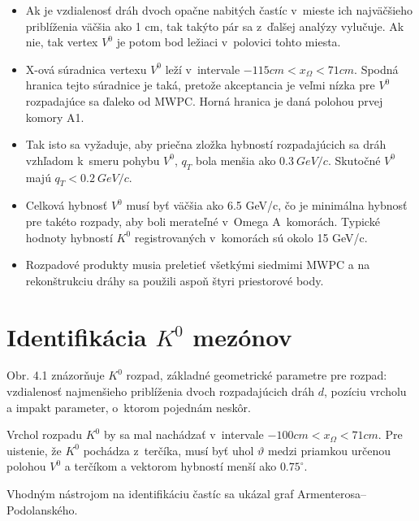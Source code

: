\begin{itemize}
\item{ Ak je vzdialenosť dráh dvoch opačne nabitých častíc  v~mieste ich
  najväčšieho priblíženia väčšia ako 1 cm, tak takýto pár sa
  z~ďalšej analýzy  vylučuje. Ak nie, tak vertex $V^{0}$ je potom bod ležiaci
  v~polovici tohto miesta.}
\item{X-ová súradnica vertexu $V^{0}$ leží v~intervale
  $-115cm<x_{\Omega}<71cm$. Spodná hranica tejto súradnice je taká, pretože
  akceptancia je veľmi nízka pre $V^{0}$ rozpadajúce sa ďaleko od MWPC. Horná
  hranica je daná polohou prvej komory A1.}
\item{Tak isto sa vyžaduje, aby priečna zložka hybností rozpadajúcich
  sa dráh vzhľadom k~smeru pohybu $V^{0}$, $q_{T}$ bola menšia ako $0.3\:
  GeV/c$. Skutočné $V^{0}$ majú $q_{T}<0.2\: GeV/c$.}
\item{Celková hybnosť $V^{0}$ musí byť väčšia ako 6.5 GeV/c, čo je
  minimálna hybnosť pre takéto rozpady, aby boli merateľné v~Omega A~komorách.
  Typické hodnoty hybností $K^{0}$ registrovaných v~komorách sú okolo 15
  GeV/c.}
\item{Rozpadové produkty musia preletieť všetkými siedmimi MWPC a na
  rekonštrukciu dráhy sa použili aspoň štyri priestorové body.}
\end{itemize}
\section{Identifikácia $K^{0}$ mezónov}
Obr. 4.1 znázorňuje $K^{0}$ rozpad, základné
geometrické parametre pre rozpad: vzdialenosť  najmenšieho priblíženia dvoch
rozpadajúcich dráh $d$, pozíciu vrcholu a impakt parameter, o~ktorom
pojednám neskôr.

Vrchol rozpadu $K^{0}$ by sa mal nachádzať v~intervale
$-100cm<x_{\Omega}<71cm$. Pre uistenie, že $K^{0}$ pochádza
z~terčíka, musí byť  uhol $\vartheta$ medzi priamkou určenou polohou $V^{0}$
a terčíkom a vektorom hybností menší ako $0.75^{\circ}$.

Vhodným nástrojom  na identifikáciu častíc sa ukázal  graf
Armenterosa--Podo\-lanského.

%
%

